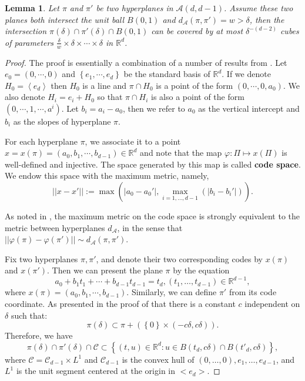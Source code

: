 \documentclass[11pt]{article}
\newtheorem{lemma}[theorem]{Lemma}
\newcommand{\1}{\mathbf{1}}
\begin{document}
 \begin{lemma}\label{4.1}
 Let $\pi$ and $\pi'$ be two hyperplanes in $\mathcal{A}(d, d-1)$. Assume these two planes both intersect the unit ball $B(0, 1)$ and $d_\mathcal{A}(\pi, \pi')=w>\delta$, then the intersection $\pi(\delta)\cap \pi'(\delta)\cap B(0, 1)$ can be covered by at most $\delta^{-(d-2)}$ cubes of parameters $\frac{\delta}{w}\times \delta\times \cdots\times \delta$ in $\mathbb{R}^d$. 
 \end{lemma}
\begin{proof}
The proof is essentially a combination of a number of results from \cite{HKM}. Let $e_0=(0, \cdots, 0)$ and $\left\{ e_1,\cdots,e_d\right\}$ be the standard basis of $\mathbb{R}^d$. If we denote $H_0=\left\langle e_d \right\rangle$ then $H_0$ is a line and $\pi \cap H_0$ is a point of the form $(0,\cdots,0,a_0)$. We also denote $H_i = e_i+H_0$ so that $\pi \cap H_i$ is also a point of the form $(0,\cdots,1,\cdots,a^i)$. Let $b_i=a_i-a_0$, then we refer to $a_0$ as the vertical intercept and $b_i$ as the slopes of hyperplane $\pi$.

For each hyperplane $\pi$, we associate it to a point $x = x(\pi) = (a_0,b_1,\cdots,b_{d-1}) \in \mathbb{R}^d$ and note that the map $\varphi\colon \Pi \mapsto x(\Pi)$ is well-defined and injective. The space generated by this map is called \textbf{code space}. We endow this space with the maximum metric, namely, 
\[||x-x'||:=\max \left(|a_0-a_0'|, \max_{i=1, \ldots, d-1}\left(|b_i-b_i'|\right)\right).\]

As noted in \cite[Remark 4.2]{HKM}, the maximum metric on the code space is strongly equivalent to the metric between hyperplanes $d_\mathcal{A}$, in the sense that $||\varphi(\pi)-\varphi(\pi')||\sim d_{\mathcal{A}}(\pi, \pi')$.

Fix two hyperplanes $\pi, \pi' $, and denote their two corresponding codes by $x(\pi)$ and $x(\pi')$. Then we can present the plane $\pi$ by the equation
\[a_0+b_1t_1+\cdots+b_{d-1}t_{d-1}=t_d, (t_1, \ldots, t_{d-1})\in \mathbb{R}^{d-1},\]
where $x(\pi) = (a_0,b_1,\cdots,b_{d-1})$. Similarly, we can define $\pi'$ from its code coordinate. As presented in the proof of \cite[Lemma 4.3]{HKM} that there is a constant $c$ independent on $\delta$ such that:
\[\pi(\delta) \subset \pi +(\left\lbrace 0 \right\rbrace \times (-c\delta,c\delta)).\]
Therefore, we have
\[ \pi(\delta) \cap \pi'(\delta) \cap \mathcal{C} \subset \left\lbrace (t,u) \in \mathbb{R}^d: u \in B(t_d,c\delta) \cap B(t'_d,c\delta)\right\rbrace, \]
where $\mathcal{C}=\mathcal{C}_{d-1}\times L^1$ and $\mathcal{C}_{d-1}$ is the convex hull of $(0, \ldots, 0), e_1, \ldots, e_{d-1}$, and $L^1$ is the unit segment centered at the origin in $<e_d>$. 


\end{proof}
\end{document}
